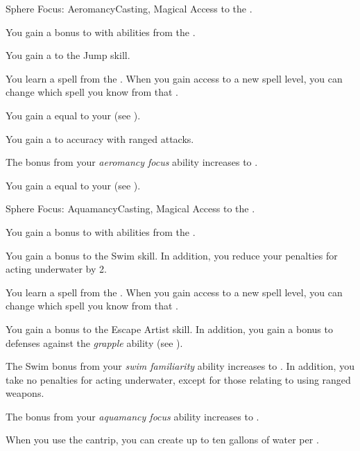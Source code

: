     \begin{feat}{Sphere Focus: Aeromancy}{Casting, Magical}
        \featpre Access to the  .

         You gain a  bonus to  with abilities from the  .

         You gain a   to the Jump skill.

         You learn a spell from the  .
        When you gain access to a new spell level, you can change which spell you know from that .

         You gain a  equal to your  (see ).

         You gain a   to accuracy with  ranged attacks.

         The bonus from your \textit{aeromancy focus} ability increases to .

         You gain a  equal to your  (see ).
    \end{feat}

    \begin{feat}{Sphere Focus: Aquamancy}{Casting, Magical}
        \featpre Access to the  .

         You gain a  bonus to  with abilities from the  .

         You gain a  bonus to the Swim skill.
        In addition, you reduce your penalties for acting underwater by 2.

         You learn a spell from the  .
        When you gain access to a new spell level, you can change which spell you know from that .

         You gain a  bonus to the Escape Artist skill.
        In addition, you gain a  bonus to defenses against the \textit{grapple} ability (see ).

         The Swim bonus from your \textit{swim familiarity} ability increases to .
        In addition, you take no penalties for acting underwater, except for those relating to using ranged weapons.

         The bonus from your \textit{aquamancy focus} ability increases to .

         When you use the  cantrip, you can create up to ten gallons of water per .
    \end{feat}

